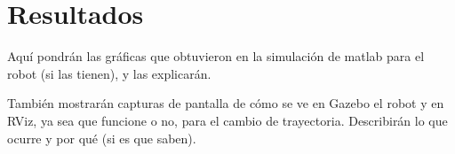 \chapter{Resultados} \label{chap:resultados}
Aquí pondrán las gráficas que obtuvieron en la simulación de matlab para el robot (si las tienen), y las explicarán.

También mostrarán capturas de pantalla de cómo se ve en Gazebo el robot y en RViz, ya sea que funcione o no, para el cambio de trayectoria. Describirán lo que ocurre y por qué (si es que saben).
